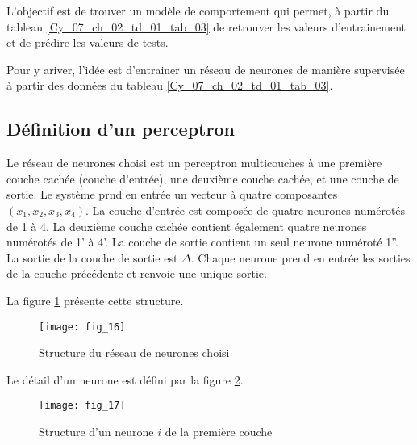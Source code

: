 L'objectif est de trouver un modèle de comportement qui permet, à partir du tableau \ref{Cy_07_ch_02_td_01_tab_03} de retrouver les valeurs d'entrainement et de prédire les valeurs de tests. 

Pour y ariver, l'idée est d'entrainer un réseau de neurones de manière supervisée à partir des données du tableau \ref{Cy_07_ch_02_td_01_tab_03}.

\ifprof
\begin{corrige}
\end{corrige}
\else
\fi

\ifprof
\begin{corrige}
\end{corrige}
\else
\fi


\subsection*{Définition d'un perceptron}

Le réseau de neurones choisi est un perceptron multicouches à une première couche cachée (couche d'entrée), une deuxième couche cachée, et une couche de sortie. Le système prnd en entrée un vecteur à quatre composantes $\left(x_1, x_2, x_3, x_4 \right)$. La couche d'entrée est composée de quatre neurones numérotés de 1 à 4. La deuxième couche cachée contient également quatre neurones numérotés de 1' à 4'. La couche de sortie contient un seul neurone numéroté 1''. La sortie de la couche de sortie est $\Delta$. Chaque neurone prend en entrée les sorties de la couche précédente et renvoie une unique sortie.

La figure \ref{Cy_07_ch_02_td_01_fig_16} présente cette structure. 


\begin{figure}[!h]
\centering
\texttt{[image: fig\_16]}
\caption{Structure du réseau de neurones choisi\label{Cy_07_ch_02_td_01_fig_16}}
\end{figure}

Le détail d'un neurone est défini par la figure \ref{Cy_07_ch_02_td_01_fig_17}.

\begin{figure}[!h]
\centering
\texttt{[image: fig\_17]}
\caption{Structure d'un neurone $i$ de la première couche\label{Cy_07_ch_02_td_01_fig_17}}
\end{figure}

